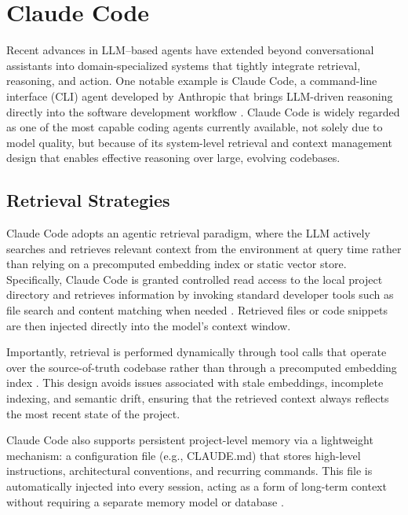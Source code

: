 \section{Claude Code}
Recent advances in LLM--based agents have extended beyond conversational assistants into domain-specialized systems that tightly integrate retrieval, reasoning, and action. One notable example is Claude Code, a command-line interface (CLI) agent developed by Anthropic that brings LLM-driven reasoning directly into the software development workflow \cite{anthropic_claude_code_tutorials}. Claude Code is widely regarded as one of the most capable coding agents currently available, not solely due to model quality, but because of its system-level retrieval and context management design that enables effective reasoning over large, evolving codebases.

\subsection{Retrieval Strategies}
Claude Code adopts an agentic retrieval paradigm, where the LLM actively searches and retrieves relevant context from the environment at query time rather than relying on a precomputed embedding index or static vector store. Specifically, Claude Code is granted controlled read access to the local project directory and retrieves information by invoking standard developer tools such as file search and content matching when needed \cite{anthropic_claude_code_settings,anthropic_claude_code_team}. Retrieved files or code snippets are then injected directly into the model’s context window.

Importantly, retrieval is performed dynamically through tool calls that operate over the source-of-truth codebase rather than through a precomputed embedding index \cite{anthropic_claude_code_settings,anthropic_claude_code_team}. This design avoids issues associated with stale embeddings, incomplete indexing, and semantic drift, ensuring that the retrieved context always reflects the most recent state of the project.

Claude Code also supports persistent project-level memory via a lightweight mechanism: a configuration file (e.g., CLAUDE.md) that stores high-level instructions, architectural conventions, and recurring commands. This file is automatically injected into every session, acting as a form of long-term context without requiring a separate memory model or database \cite{anthropic_claude_code_memory}.

